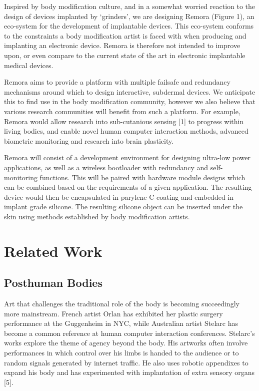 \documentclass[runningheads,a4paper]{llncs}
\begin{document}
Inspired by body modification culture, and in a somewhat worried reaction to the design of devices implanted by ‘grinders’, we are designing Remora (Figure 1), an eco-system for the development of implantable devices. This eco-system conforms to the constraints a body modification artist is faced with when producing and implanting an electronic device. Remora is therefore not intended to improve upon, or even compare to the current state of the art in electronic implantable medical devices. 

Remora aims to provide a platform with multiple failsafe and redundancy mechanisms around which to design interactive, subdermal devices. We anticipate this to find use in the body modification community, however we also believe that various research communities will benefit from such a platform. For example, Remora would allow research into sub-cutanious sensing [1] to progress within living bodies, and enable novel human computer interaction methods, advanced biometric monitoring and research into brain plasticity. 

Remora will consist of a development environment for designing ultra-low power applications, as well as a wireless bootloader with redundancy and self-monitoring functions. This will be paired with hardware module designs which can be combined based on the requirements of a given application. The resulting device would then be encapsulated in parylene C coating and embedded in implant grade silicone. The resulting silicone object can be inserted under the skin using methods established by body modification artists.
 
\section{Related Work}
\subsection{Posthuman Bodies}
Art that challenges the traditional role of the body is becoming succeedingly more mainstream. French artist Orlan has exhibited her plastic surgery performance at the Guggenheim in NYC, while Australian artist Stelarc has become a common reference at human computer interaction conferences. Stelarc's works explore the theme of agency beyond the body. His artworks often involve performances in which control over his limbs is handed to the audience or to random signals generated by internet traffic. He also uses robotic appendixes to expand his body and has experimented with implantation of extra sensory organs [5].
\end{document}
